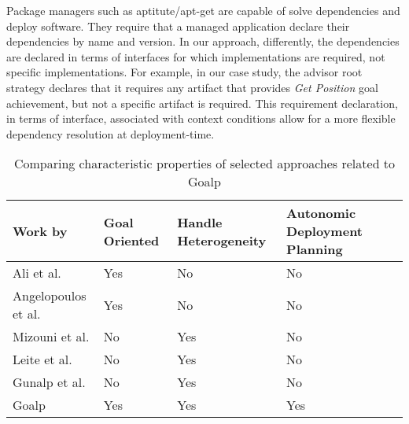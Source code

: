 Package managers such as aptitute/apt-get are capable of solve dependencies and deploy software. They require that a managed application declare their dependencies by name and version. In our approach, differently, the dependencies are declared in terms of interfaces for which implementations are required, not specific implementations. For example, in our case study, the advisor root strategy declares that it requires any artifact that provides \emph{Get Position} goal achievement, but not a specific artifact is required.
This requirement declaration, in terms of interface, associated with context conditions allow for a more flexible dependency resolution at deployment-time.

\begin{table*}[!ht]
\centering
\caption{Comparing characteristic properties of selected approaches related to Goalp}
\label{table_related_works}
\begin{tabular}{|p{4cm}|p{1.75cm}|p{1.75cm}|p{1.75cm}|p{1.75cm}|}
\hline
Work by &
   Goal  \newline Oriented &
    Handle  \newline Heterogeneity &
    Autonomic  \newline  Deployment \newline Planning \\ \hline

Ali et al.\citep{ali_requirements-driven_2014} & Yes & No & No \\ \hline
Angelopoulos et al. \cite{angelopoulos_capturing_2015} & Yes & No & No \\ \hline
Mizouni et al. \citep{mizouni_framework_2014} & No & Yes & No \\ \hline
Leite et al. \citep{ferreira_leite_user_2014}  & No & Yes & No \\ \hline
Gunalp et al.\citep{gunalp_rondo_2015} & No & Yes  &  No\\ \hline
Goalp & Yes & Yes & Yes \\ \hline
\end{tabular}
\end{table*}



